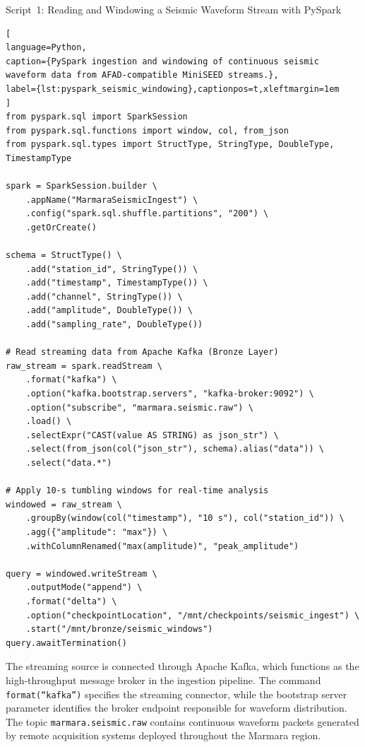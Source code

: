 \documentclass[data,article,accept,pdftex,moreauthors]{Definitions/mdpi}
\begin{document}
Script~1: %
 Reading and Windowing a Seismic Waveform Stream with PySpark
\vspace{1pt}
\begin{lstlisting}[
language=Python,
caption={PySpark ingestion and windowing of continuous seismic waveform data from AFAD-compatible MiniSEED streams.},
label={lst:pyspark_seismic_windowing},captionpos=t,xleftmargin=1em
]
from pyspark.sql import SparkSession
from pyspark.sql.functions import window, col, from_json
from pyspark.sql.types import StructType, StringType, DoubleType, TimestampType

spark = SparkSession.builder \
    .appName("MarmaraSeismicIngest") \
    .config("spark.sql.shuffle.partitions", "200") \
    .getOrCreate()

schema = StructType() \
    .add("station_id", StringType()) \
    .add("timestamp", TimestampType()) \
    .add("channel", StringType()) \
    .add("amplitude", DoubleType()) \
    .add("sampling_rate", DoubleType())

# Read streaming data from Apache Kafka (Bronze Layer)
raw_stream = spark.readStream \
    .format("kafka") \
    .option("kafka.bootstrap.servers", "kafka-broker:9092") \
    .option("subscribe", "marmara.seismic.raw") \
    .load() \
    .selectExpr("CAST(value AS STRING) as json_str") \
    .select(from_json(col("json_str"), schema).alias("data")) \
    .select("data.*")

# Apply 10-s tumbling windows for real-time analysis
windowed = raw_stream \
    .groupBy(window(col("timestamp"), "10 s"), col("station_id")) \
    .agg({"amplitude": "max"}) \
    .withColumnRenamed("max(amplitude)", "peak_amplitude")

query = windowed.writeStream \
    .outputMode("append") \
    .format("delta") \
    .option("checkpointLocation", "/mnt/checkpoints/seismic_ingest") \
    .start("/mnt/bronze/seismic_windows")
query.awaitTermination()
\end{lstlisting}

\vspace{2pt}
The streaming source is connected through Apache Kafka, which functions as the high-throughput message broker in the ingestion pipeline. The command
\texttt{format(``kafka'')}
specifies the streaming connector, while the bootstrap server parameter identifies the broker endpoint responsible for waveform distribution. The topic
\texttt{marmara.seismic.raw}
contains continuous waveform packets generated by remote acquisition systems deployed throughout the Marmara region.
\end{document}
